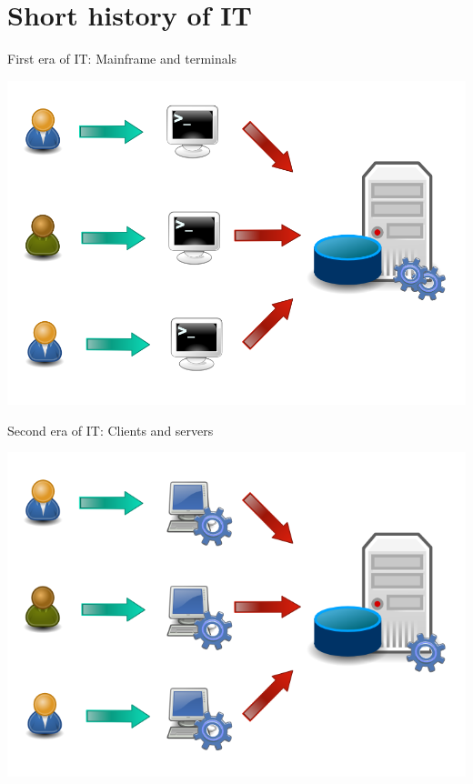 {  \section{Short history of IT}

  \begin{frame}{First era of IT: Mainframe and terminals}
    \begin{center}
      \includegraphics[scale=0.3]{img/mainframe-terminals.png}
    \end{center}
  \end{frame}

  \begin{frame}{Second era of IT: Clients and servers}
    \begin{center}
      \includegraphics[scale=0.3]{img/fat-clients.png}
    \end{center}
  \end{frame}

}
